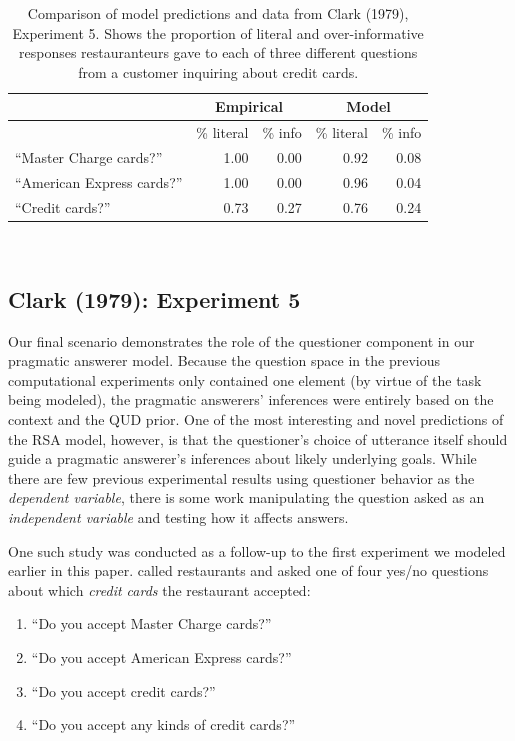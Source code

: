 \documentclass[12pt, floatsintext, jou]{apa6}
\begin{document}
\begin{table}[t!]
\centering
\begin{tabular}{ p{5cm} | r | r ||||||  r | r }
& \multicolumn{2}{c||||||}{Empirical} & \multicolumn{2}{c}{Model} \\
\hline
&           \% literal &   \%  info &           \% literal &   \%  info    \\
\hline
``Master Charge cards?'' &   1.00 & 0.00 &  0.92 & 0.08 \\
\hline
``American Express cards?''     & 1.00 & 0.00 & 0.96 & 0.04 \\
\hline
``Credit cards?''     & 0.73 & 0.27 & 0.76 & 0.24 \\
\end{tabular}
\\[1.5pt]
\caption{Comparison of model predictions and data from Clark (1979), Experiment 5. Shows the proportion of literal and over-informative responses restauranteurs gave to each of three different questions from a customer inquiring about credit cards.} 
\label{table:clark79exp5}
\end{table}

\subsection{Clark (1979): Experiment 5}
Our final scenario demonstrates the role of the questioner component in our pragmatic answerer model. Because the question space in the previous computational experiments only contained one element (by virtue of the task being modeled), the pragmatic answerers' inferences were entirely based on the context and the QUD prior. One of the most interesting and novel predictions of the RSA model, however, is that the questioner's choice of utterance itself should guide a pragmatic answerer's inferences about likely underlying goals. While there are few previous experimental results using questioner behavior as the \emph{dependent variable}, there is some work manipulating the question asked as an \emph{independent variable} and testing how it affects answers.

One such study was conducted as a follow-up to the first experiment we modeled earlier in this paper.   called restaurants and asked one of four yes/no questions about which \emph{credit cards} the restaurant accepted:

\begin{enumerate}
\item ``Do you accept Master Charge cards?'' 
\item ``Do you accept American Express cards?''
\item ``Do you accept credit cards?'' 
\item ``Do you accept any kinds of credit cards?'' 
\end{enumerate}
\end{document}

